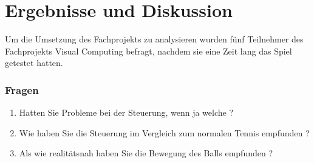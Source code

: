 
\chapter{Ergebnisse und Diskussion}
\label{Kapitel 5}
%
Um die Umsetzung des Fachprojekts zu analysieren wurden fünf Teilnehmer des Fachprojekts Visual Computing befragt, nachdem sie eine Zeit lang das Spiel getestet hatten.
\subsection{Fragen}
\begin{enumerate}
	\item \glqq Hatten Sie Probleme bei der Steuerung, wenn ja welche ?\grqq
	\item \glqq Wie haben Sie die Steuerung im Vergleich zum normalen Tennis empfunden ?\grqq
	\item \glqq Als wie realitätsnah haben Sie die Bewegung des Balls empfunden ?\grqq
\end{enumerate}
